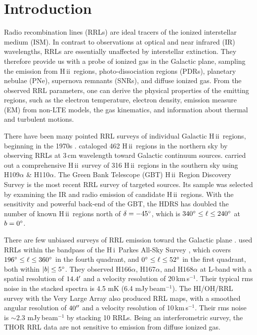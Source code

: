 \documentclass[manuscript]{aastex61}
\newcommand{\hii}{{\rm H\,}{{\sc ii}}}
\newcommand{\hi}{{\rm H\,}{{\sc i}}}
\newcommand{\kms}{\,km\,s$^{-1}$}
\begin{document}
\keywords{radio lines: ISM --- \hii\ regions --- catalogs --- surveys}

\section{Introduction} \label{sec_intr}
Radio recombination lines (RRLs) are ideal tracers of the ionized interstellar medium (ISM).
In contrast to observations at optical and near infrared (IR) wavelengths, RRLs are essentially unaffected by interstellar extinction.  They therefore provide us with a probe of ionized gas in the Galactic plane, sampling the emission from \hii\ regions, photo-dissociation regions (PDRs), planetary nebulae (PNe), supernova remnants (SNRs), and diffuse ionized gas.  From the observed RRL parameters, one can derive the physical properties of the emitting regions, such as the electron temperature, electron density, emission measure (EM) from non-LTE models, the gas kinematics, and information about thermal and turbulent motions.

There have been many pointed RRL surveys of individual Galactic \hii\ regions, beginning in the 1970s \citep[e.g.][]{Reifenstein1970,Wilson1970,Churchwell1978}.
\citet{Lockman1989} cataloged 462 \hii\ regions in the northern sky by observing RRLs at 3\,cm wavelength toward Galactic continuum sources.
\citet{Caswell1987} carried out a comprehensive \hii\ survey of 316 \hii\ regions in the southern sky using H109$\alpha$ \& H110$\alpha$.
The Green Bank Telescope (GBT) \hii\ Region Discovery Survey \citep[GBT HRDS;][]{Bania2010,Anderson2011,Anderson2015} is the most recent RRL survey of targeted sources.
Its sample was selected by examining the IR and radio emission of candidate \hii\ regions. 
With the sensitivity and powerful back-end of the GBT, the HDRS has doubled the number of known \hii\ regions north of $\delta=-45\mbox{$^\circ$}$, which is $340\mbox{$^\circ$} \leq \ell \leq 240\mbox{$^\circ$}$ at $b = 0\mbox{$^\circ$}$.

There are few unbiased surveys of RRL emission toward the Galactic plane \citep[e.g.,][]{Lockman1976,Anantharamaiah1986,Roshi2000}.
\citet{Alves2010,Alves2012,Alves2015} used RRLs within the bandpass of the \hi\ Parkes All-Sky Survey \citep[HIPASS;][]{Staveley1996}, which covers $196\mbox{$^\circ$} \leq \ell \leq 360\mbox{$^\circ$}$ in the fourth quadrant, and $0\mbox{$^\circ$} \leq \ell \leq 52\mbox{$^\circ$}$ in the first quadrant, both within $|b| \leq 5\mbox{$^\circ$}$.
They observed H166$\alpha$, H167$\alpha$, and H168$\alpha$ at L-band with a spatial resolution of $14.4\mbox{$^\prime$}$ and a velocity resolution of 20\kms. 
Their typical rms noise in the stacked spectra is 4.5 mK (6.4 mJy\,beam$^{-1}$).
The HI/OH/RRL survey with the Very Large Array \citep[THOR;][]{Beuther2016} also produced RRL maps, with a smoothed angular resolution of $40\mbox{$^{\prime\prime}$}$ and a velocity resolution of 10\kms. Their rms noise is $\sim2.3$ mJy\,beam$^{-1}$ by stacking 10 RRLs.
Being an interferometric survey, the THOR RRL data are not sensitive to emission from diffuse ionized gas.
\end{document}
